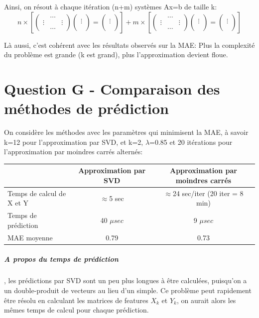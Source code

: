 \documentclass[12pt,a4paper]{article}
\begin{document}
Ainsi, on résout à chaque itération (n+m) systèmes Ax=b de taille k:
$$
n\times \left[  \begin{pmatrix}
 &\dots  & \\ 
\vdots &  &\vdots \\ 
 &\dots  & 
\end{pmatrix}
\begin{pmatrix}
\\ 
\vdots \\ 
\\
\end{pmatrix}
=
\begin{pmatrix}
\\ 
\vdots \\ 
\\
\end{pmatrix}\right ]
+m\times \left[  \begin{pmatrix}
 &\dots  & \\ 
\vdots &  &\vdots \\ 
 &\dots  & 
\end{pmatrix}
\begin{pmatrix}
\\ 
\vdots \\ 
\\
\end{pmatrix}
=
\begin{pmatrix}
\\ 
\vdots \\ 
\\
\end{pmatrix}\right ]
$$

Là aussi, c'est cohérent avec les résultats observés sur la MAE: Plus la complexité du problème est grande (k est grand), plus l'approximation devient floue.
\newpage
\section{Question G - Comparaison des méthodes de prédiction}
On considère les méthodes avec les paramètres qui minimisent la MAE, à savoir k=12 pour l'approximation par SVD, et k=2, $\lambda$=0.85 et 20 itérations pour l'approximation par moindres carrés alternés:
\begin{table}[h]
\begin{tabular}{|l|c|c|}
\hline
 & Approximation par SVD & Approximation par moindres carrés\\
\hline
Temps de calcul de X et Y & $\approx$5 sec & $\approx$24 sec/iter (20 iter = 8 min) \\
\hline
Temps de prédiction & 40 $\mu sec$ & 9 $\mu sec$\\
\hline
MAE moyenne & 0.79 & 0.73 \\
\hline
\end{tabular}
\end{table}
\subparagraph{A propos du temps de prédiction}, les prédictions par SVD sont un peu plus longues à être calculées, puisqu'on a un double-produit de vecteurs au lieu d'un simple. Ce problème peut rapidement être résolu en calculant les matrices de features $X_k$ et $Y_k$, on aurait alors les mêmes temps de calcul pour chaque prédiction.\\
\end{document}
